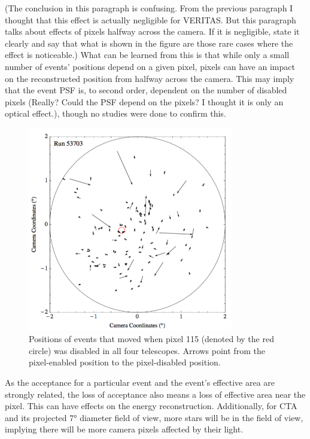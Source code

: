     {\color{red}(The conclusion in this paragraph is confusing. From the previous paragraph I thought that this effect is actually negligible for VERITAS. But this paragraph talks about effects of pixels halfway across the camera. If it is negligible, state it clearly and say that what is shown in the figure are those rare cases where the effect is noticeable.)}
    What can be learned from this is that while only a small number of events' positions depend on a given pixel, pixels can have an impact on the reconstructed position from halfway across the camera.
    This may imply that the event PSF is, to second order, dependent on the number of disabled pixels {\color{red}(Really? Could the PSF depend on the pixels? I thought it is only an optical effect.)}, though no studies were done to confirm this.


    \begin{figure}[ht]
      \centering
      \includegraphics[width=0.8\textwidth]{images/disabled_pixel/moving_events}
      \caption[Event Movement]{
        Positions of events that moved when pixel 115 (denoted by the red circle) was disabled in all four telescopes.  
        Arrows point from the pixel-enabled position to the pixel-disabled position.
      }
      \label{fig:dpix_move}
    \end{figure}

    As the acceptance for a particular event and the event's effective area are strongly related, the loss of acceptance also means a loss of effective area near the pixel.
    This can have effects on the energy reconstruction.
    Additionally, for CTA and its projected \ang{7} diameter field of view, more stars will be in the field of view, implying there will be more camera pixels affected by their light.
    
